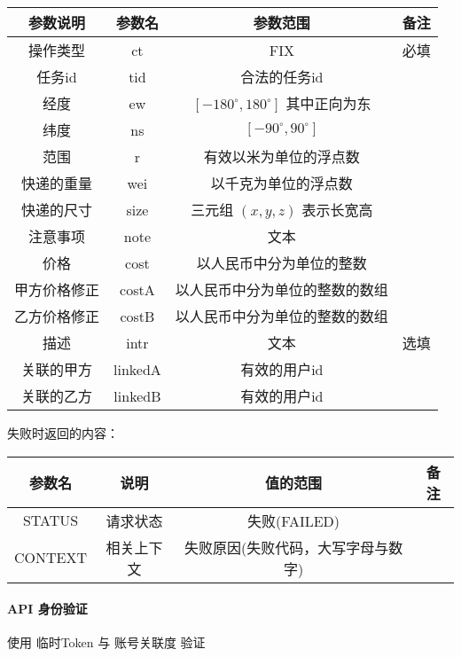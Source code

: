 \documentclass[UTF8]{dingo}
\def\apiauth{\paragraph{\colorbox[rgb]{0.45,0.9,1}{API 身份验证}}} %
\def\失败{\colorbox[rgb]{1,0.5,0.5}{失败}}
\def\失败V{失败(FAILED)}
\def\失败原因{失败原因(失败代码，大写字母与数字)}
\begin{document}
    \begin{tabular}{|c|c|c|c|}
        \hline \rule[-2ex]{0pt}{5.5ex} 参数说明 & 参数名 & 参数范围 & 备注 \\        \hline \rule[-2ex]{0pt}{5.5ex} 操作类型 & ct & FIX & 必填 \\
        \hline \rule[-2ex]{0pt}{5.5ex} 任务id & tid & 合法的任务id &  \\
        \hline \rule[-2ex]{0pt}{5.5ex} 经度 & ew & $[-180^\circ,180^\circ]$ 其中正向为东 &  \\
        \hline \rule[-2ex]{0pt}{5.5ex} 纬度 & ns & $[-90^\circ,90^\circ]$ &  \\
        \hline \rule[-2ex]{0pt}{5.5ex} 范围 & r & 有效以米为单位的浮点数 &  \\
        \hline \rule[-2ex]{0pt}{5.5ex} 快递的重量 & wei & 以千克为单位的浮点数 &  \\
        \hline \rule[-2ex]{0pt}{5.5ex} 快递的尺寸 & size & 三元组 $(x,y,z)$ 表示长宽高 &  \\
        \hline \rule[-2ex]{0pt}{5.5ex} 注意事项 & note & 文本 &  \\
        \hline \rule[-2ex]{0pt}{5.5ex} 价格 & cost & 以人民币中分为单位的整数 &  \\
        \hline \rule[-2ex]{0pt}{5.5ex} 甲方价格修正 & costA & 以人民币中分为单位的整数的数组 &  \\
        \hline \rule[-2ex]{0pt}{5.5ex} 乙方价格修正 & costB & 以人民币中分为单位的整数的数组 &  \\
        \hline \rule[-2ex]{0pt}{5.5ex} 描述 & intr & 文本 & 选填 \\
        \hline \rule[-2ex]{0pt}{5.5ex} 关联的甲方 & linkedA & 有效的用户id &  \\
        \hline \rule[-2ex]{0pt}{5.5ex} 关联的乙方 & linkedB & 有效的用户id &  \\
        \hline
    \end{tabular}
    \par \失败 时返回的内容：\\
    \begin{tabular}{|c|c|c|c|}
        \hline \rule[-2ex]{0pt}{5.5ex} 参数名 & 说明 & 值的范围 & 备注 \\
        \hline \rule[-2ex]{0pt}{5.5ex} STATUS & 请求状态 & \失败V &  \\
        \hline \rule[-2ex]{0pt}{5.5ex} CONTEXT & 相关上下文 & \失败原因 &  \\
        \hline
    \end{tabular}
    \apiauth
    使用 临时Token 与 账号关联度 验证
\end{document}
